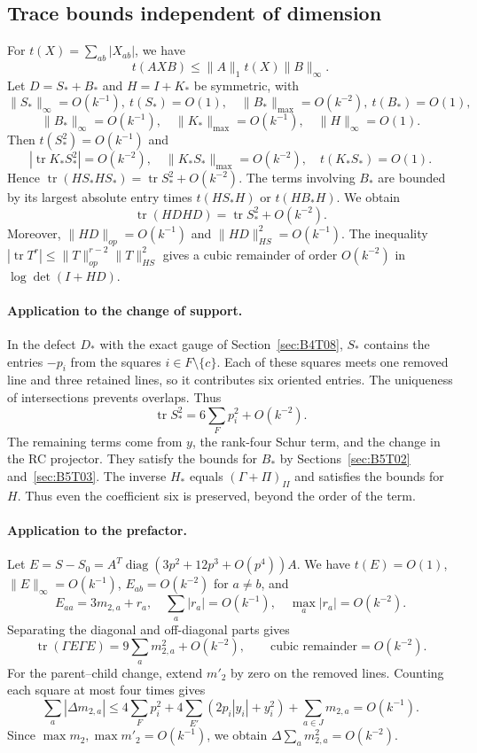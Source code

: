 \subsection{Trace bounds independent of dimension}\label{sec:B5T04}
For $t(X)=\sum_{ab}|X_{ab}|$, we have
\[
 t(AXB)\le\|A\|_1t(X)\|B\|_\infty.
\]
Let $D=S_*+B_*$ and $H=I+K_*$ be symmetric, with
\[
 \|S_*\|_\infty=O(k^{-1}),\ t(S_*)=O(1),\quad
 \|B_*\|_{\max}=O(k^{-2}),\ t(B_*)=O(1),
\]
\[
 \|B_*\|_\infty=O(k^{-1}),\quad
 \|K_*\|_{\max}=O(k^{-1}),\quad\|H\|_\infty=O(1).
\]
Then $t(S_*^2)=O(k^{-1})$ and
\[
 |\operatorname{tr}K_*S_*^2|=O(k^{-2}),\quad
 \|K_*S_*\|_{\max}=O(k^{-2}),\quad t(K_*S_*)=O(1).
\]
Hence $\operatorname{tr}(HS_*HS_*)=\operatorname{tr}S_*^2+O(k^{-2})$.
The terms involving $B_*$ are bounded by its largest absolute entry times
$t(HS_*H)$ or $t(HB_*H)$. We obtain
\[
 \boxed{\operatorname{tr}(HDHD)=\operatorname{tr}S_*^2+O(k^{-2}).}
\]
Moreover, $\|HD\|_{op}=O(k^{-1})$ and $\|HD\|_{HS}^2=O(k^{-1})$.
The inequality $|\operatorname{tr}T^r|\le\|T\|_{op}^{r-2}\|T\|_{HS}^2$
gives a cubic remainder of order $O(k^{-2})$ in $\log\det(I+HD)$.

\paragraph{Application to the change of support.}
In the defect $D_*$ with the exact gauge of Section~\ref{sec:B4T08}, $S_*$ contains
the entries $-p_i$ from the squares $i\in F\setminus\{c\}$.
Each of these squares meets one removed line and three retained lines, so it contributes six
oriented entries. The uniqueness of intersections prevents overlaps.
Thus
\[
 \operatorname{tr}S_*^2=6\sum_Fp_i^2+O(k^{-2}).
\]
The remaining terms come from $y$, the rank-four Schur term, and the change in the
RC projector. They satisfy the bounds for $B_*$ by Sections~\ref{sec:B5T02} and~\ref{sec:B5T03}.
The inverse $H_*$ equals $(\Gamma+\Pi)_{II}$ and satisfies the bounds for $H$.
Thus even the coefficient six is preserved, beyond the order of the term.

\paragraph{Application to the prefactor.}
Let $E=S-S_0=A^T\operatorname{diag}(3p^2+12p^3+O(p^4))A$.
We have $t(E)=O(1)$, $\|E\|_\infty=O(k^{-1})$,
$E_{ab}=O(k^{-2})$ for $a\ne b$, and
\[
 E_{aa}=3m_{2,a}+r_a,\quad\sum_a|r_a|=O(k^{-1}),
 \quad\max_a|r_a|=O(k^{-2}).
\]
Separating the diagonal and off-diagonal parts gives
\[
 \operatorname{tr}(\Gamma E\Gamma E)
 =9\sum_a m_{2,a}^2+O(k^{-2}),\qquad
 \text{cubic remainder}=O(k^{-2}).
\]
For the parent--child change, extend $m'_2$ by zero on the removed lines.
Counting each square at most four times gives
\[
 \sum_a|\Delta m_{2,a}|\le
 4\sum_Fp_i^2+4\sum_{E'}(2p_i|y_i|+y_i^2)+\sum_{a\in J}m_{2,a}
 =O(k^{-1}).
\]
Since $\max m_2,\max m'_2=O(k^{-1})$, we obtain
$\Delta\sum_a m_{2,a}^2=O(k^{-2})$.

